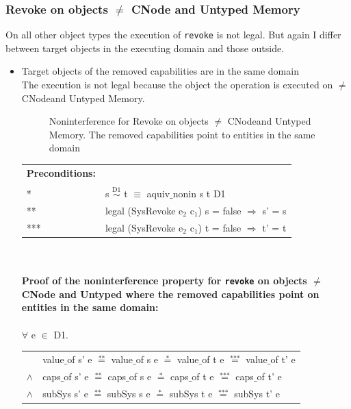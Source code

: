\documentclass[11pt,a4paper,twoside]{article}
\begin{document}
{\subsubsection{Revoke on objects $\neq$ CNode and Untyped Memory} 
On all other object types the execution of \texttt{revoke} is not legal. But again I differ between target objects in the executing domain and those outside.
\begin{itemize}
\item Target objects of the removed capabilities are in the same domain \\
The execution is not legal because the object the operation is executed on $\neq$ CNodeand Untyped Memory.
\begin{flushleft}
\begin{figure}[H]
\caption{Noninterference for Revoke on objects $\neq$ CNodeand Untyped Memory. The removed capabilities point to entities in the same domain}
\label{fig:RevokeOthers}
\end{figure}
\end{flushleft}
\begin{tabular}{ll}
\textbf{Preconditions:} \\ \\
* & s $\overset{\text{D1}}{\sim}$ t $\equiv$ aquiv$\_$nonin s t D1	\\ 
** & legal (SysRevoke e$_2$ c$_1$) s = false $\Rightarrow$ s' = s \\ 
*** & legal (SysRevoke e$_2$ c$_1$) t = false $\Rightarrow$ t' = t
\end{tabular} \\ \\ 
\textbf{Proof of the noninterference property for \texttt{revoke} on objects $\neq$ CNode and Untyped where the removed capabilities point on entities in the same domain:}\\ \\
$\forall$ e $\in$ D1. \\
\begin{tabular}{ll}
& value$\_$of s' e $\overset{\text{**}}{=}$ value$\_$of s e $\overset{\text{*}}{=}$ value$\_$of t e $\overset{\text{***}}{=}$ value$\_$of t' e \\
$\wedge$ & caps$\_$of s' e $\overset{\text{**}}{=}$ caps$\_$of s e $\overset{\text{*}}{=}$ caps$\_$of t e $\overset{\text{***}}{=}$ caps$\_$of t' e \\
$\wedge$ & subSys s' e $\overset{\text{**}}{=}$ subSys s e $\overset{\text{*}}{=}$ subSys t e $\overset{\text{***}}{=}$ subSys t' e

\end{tabular}
\end{itemize}}
\end{document}

